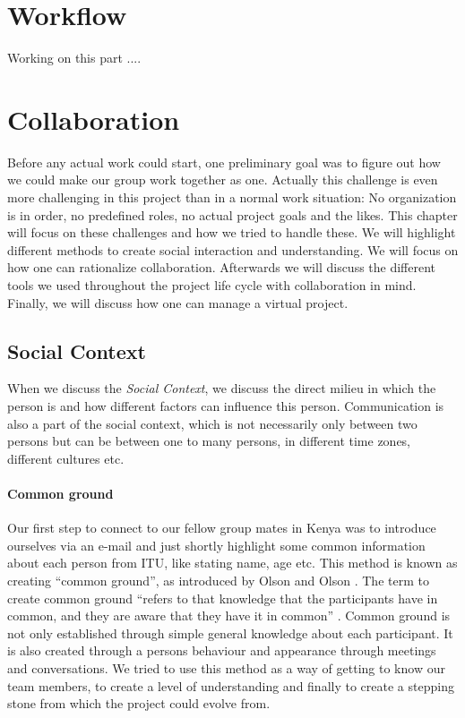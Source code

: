 \section{Workflow} \label{sec:workflow}
Working on this part ....

\section{Collaboration} \label{sec:collaboration}
Before any actual work could start, one preliminary goal was to figure out how we could make our group work together as one. Actually this challenge is even more challenging in this project than in a normal work situation: No organization is in order, no predefined roles, no actual project goals and the likes. This chapter will focus on these challenges and how we tried to handle these. We will highlight different methods to create social interaction and understanding. We will focus on how one can rationalize collaboration. Afterwards we will discuss the different tools we used throughout the project life cycle with collaboration in mind. Finally, we will discuss how one can manage a virtual project.\\

\subsection{Social Context} \label{subsec:socialcontext}
When we discuss the \textit{Social Context}, we discuss the direct milieu in which the person is and how different factors can influence this person. Communication is also a part of the social context, which is not necessarily only between two persons but can be between one to many persons, in different time zones, different cultures etc.\\
\paragraph{Common ground} \label{par:commonground}
Our first step to connect to our fellow group mates in Kenya was to introduce ourselves via an e-mail and just shortly highlight some common information about each person from ITU, like stating name, age etc. This method is known as creating ``common ground'', as introduced by Olson and Olson \cite{olson:2000:distance}. The term to create common ground ``refers to that knowledge that the participants have in common, and they are aware that they have it in common'' \cite{olson:2000:distance}. Common ground is not only established through simple general knowledge about each participant. It is also created through a persons behaviour and appearance through meetings and conversations. We tried to use this method as a way of getting to know our team members, to create a level of understanding and finally to create a stepping stone from which the project could evolve from.

